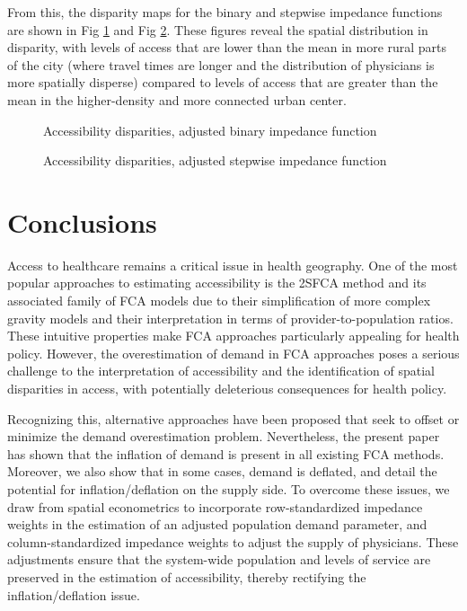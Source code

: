 \documentclass[10pt,letterpaper]{article}
\begin{document}
From this, the disparity maps for the binary and stepwise impedance
functions are shown in Fig \ref{fig:fig14-map-disparities-binary} and
Fig \ref{fig:fig15-map-disparities-stepwise}. These figures reveal the
spatial distribution in disparity, with levels of access that are lower
than the mean in more rural parts of the city (where travel times are
longer and the distribution of physicians is more spatially disperse)
compared to levels of access that are greater than the mean in the
higher-density and more connected urban center.

\begin{figure}[htbp]
\centering
\caption{\label{fig:fig14-map-disparities-binary}Accessibility
disparities, adjusted binary impedance function}
\end{figure}

\begin{figure}[htbp]
\centering
\caption{\label{fig:fig15-map-disparities-stepwise}Accessibility
disparities, adjusted stepwise impedance function}
\end{figure}

\section{Conclusions}\label{conclusions}

Access to healthcare remains a critical issue in health geography. One
of the most popular approaches to estimating accessibility is the 2SFCA
method and its associated family of FCA models due to their
simplification of more complex gravity models and their interpretation
in terms of provider-to-population ratios. These intuitive properties
make FCA approaches particularly appealing for health policy. However,
the overestimation of demand in FCA approaches poses a serious challenge
to the interpretation of accessibility and the identification of spatial
disparities in access, with potentially deleterious consequences for
health policy.

Recognizing this, alternative approaches have been proposed that seek to
offset or minimize the demand overestimation problem. Nevertheless, the
present paper has shown that the inflation of demand is present in all
existing FCA methods. Moreover, we also show that in some cases, demand
is deflated, and detail the potential for inflation/deflation on the
supply side. To overcome these issues, we draw from spatial econometrics
to incorporate row-standardized impedance weights in the estimation of
an adjusted population demand parameter, and column-standardized
impedance weights to adjust the supply of physicians. These adjustments
ensure that the system-wide population and levels of service are
preserved in the estimation of accessibility, thereby rectifying the
inflation/deflation issue.
\end{document}
